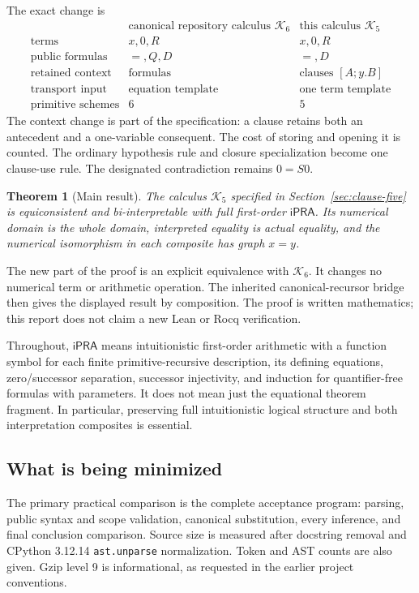 \documentclass[11pt,letterpaper]{article}
\newtheorem{theorem}{Theorem}[section]
\theoremstyle{definition}\newtheorem{definition}[theorem]{Definition}
\newcommand{\ipra}{\mathsf{iPRA}}
\newcommand{\Kfive}{\mathcal K_5}
\newcommand{\Ksix}{\mathcal K_6}
\newcommand{\file}[1]{\texttt{\small\nolinkurl{#1}}}
\begin{document}
The exact change is
\[
\begin{array}{c|c|c}
&\text{canonical repository calculus }\Ksix&\text{this calculus }\Kfive\\\hline
\text{terms}&x,0,R&x,0,R\\
\text{public formulas}&=,Q,D&=,D\\
\text{retained context}&\text{formulas}&\text{clauses }[A;y.B]\\
\text{transport input}&\text{equation template}&\text{one term template}\\
\text{primitive schemes}&6&5
\end{array}
\]
The context change is part of the specification: a clause retains both an antecedent and a one-variable consequent. The cost of storing and opening it is counted. The ordinary hypothesis rule and closure specialization become one clause-use rule. The designated contradiction remains $0=S0$.

\begin{theorem}[Main result]
The calculus $\Kfive$ specified in Section~\ref{sec:clause-five} is equiconsistent and bi-interpretable with full first-order $\ipra$. Its numerical domain is the whole domain, interpreted equality is actual equality, and the numerical isomorphism in each composite has graph $x=y$.
\end{theorem}

The new part of the proof is an explicit equivalence with $\Ksix$. It changes no numerical term or arithmetic operation. The inherited canonical-recursor bridge then gives the displayed result by composition. The proof is written mathematics; this report does not claim a new Lean or Rocq verification.

Throughout, $\ipra$ means intuitionistic first-order arithmetic with a function symbol for each finite primitive-recursive description, its defining equations, zero/successor separation, successor injectivity, and induction for quantifier-free formulas with parameters. It does not mean just the equational theorem fragment. In particular, preserving full intuitionistic logical structure and both interpretation composites is essential.

\subsection{What is being minimized}
The primary practical comparison is the complete acceptance program: parsing, public syntax and scope validation, canonical substitution, every inference, and final conclusion comparison. Source size is measured after docstring removal and CPython 3.12.14 \file{ast.unparse} normalization. Token and AST counts are also given. Gzip level 9 is informational, as requested in the earlier project conventions.
\end{document}
